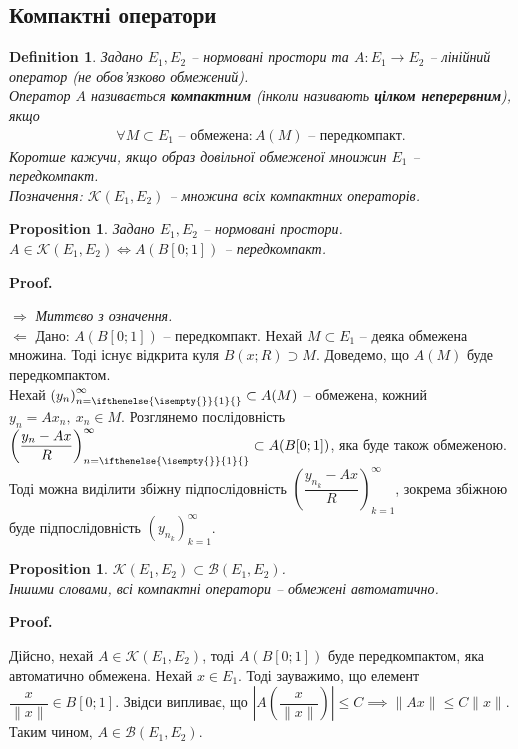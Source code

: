 \documentclass[a4paper, 10pt]{article}
\makeatletter
\def\rightproof{$\boxed{\Rightarrow}$ }
\def\leftproof{$\boxed{\Leftarrow}$ }
\theoremstyle{theoremdd}
\theoremstyle{theoremdd}
\newtheorem{definition}[theorem]{Definition}
\theoremstyle{theoremdd}
\theoremstyle{theoremdd}
\theoremstyle{theoremdd}
\newtheorem{proposition}[theorem]{Proposition}
\theoremstyle{theoremdd}
\theoremstyle{theoremdd}
\theoremstyle{theoremdd}
\newcommand{\sequence}[2][]{\left({#2}\right)_{n=\ifthenelse{\isempty{#1}}{1}{#1}}^{\infty}}
\renewenvironment{proof}[1][Proof.\\]{\par
\pushQED{\hfill \qed}%
\normalfont \topsep6\p@\@plus6\p@\relax
\trivlist
\item\relax
{\bfseries
#1\@addpunct{.}}\hspace\labelsep\ignorespaces
}{%
\popQED\endtrivlist\@endpefalse
}
\makeatother
\begin{document}
\subsection{Компактні оператори}
\begin{definition}
Задано $E_1,E_2$ -- нормовані простори та $A \colon E_1 \to E_2$ -- лінійний оператор (не обов'язково обмежений).\\
Оператор $A$ називається \textbf{компактним} (інколи називають \textbf{цілком неперервним}), якщо
\begin{align*}
\forall M \subset E_1 \text{ -- обмежена}: A(M) \text{ -- передкомпакт.}
\end{align*}
Коротше кажучи, якщо образ довільної обмеженої мноижин $E_1$ -- передкомпакт.\\
Позначення: $\mathcal{K}(E_1,E_2)$ -- множина всіх компактних операторів.
\end{definition}

\begin{proposition}
Задано $E_1,E_2$ -- нормовані простори.\\
$A \in \mathcal{K}(E_1,E_2) \iff A(B[0;1])$ -- передкомпакт.
\end{proposition}

\begin{proof}
\rightproof \textit{Миттєво з означення.}
\bigskip \\
\leftproof Дано: $A(B[0;1])$ -- передкомпакт. Нехай $M \subset E_1$ -- деяка обмежена множина. Тоді існує відкрита куля $B(x;R) \supset M$. Доведемо, що $A(M)$ буде передкомпактом.\\
Нехай $\sequence{y_n} \subset A(M)$ -- обмежена, кожний $y_n = Ax_n,\ x_n \in M$. Розглянемо послідовність $\sequence{\dfrac{y_n - Ax}{R}} \subset A(B[0;1])$, яка буде також обмеженою. Тоді можна виділити збіжну підпослідовність $\left( \dfrac{y_{n_k} - Ax}{R}\right)_{k=1}^\infty$, зокрема збіжною буде підпослідовність $(y_{n_k})_{k=1}^\infty$.
\end{proof}

\begin{proposition}
$\mathcal{K}(E_1,E_2) \subset \mathcal{B}(E_1,E_2)$.\\
Іншими словами, всі компактні оператори -- обмежені автоматично.
\end{proposition}

\begin{proof}
Дійсно, нехай $A \in \mathcal{K}(E_1,E_2)$, тоді $A(B[0;1])$ буде передкомпактом, яка автоматично обмежена. Нехай $x \in E_1$. Тоді зауважимо, що елемент $\dfrac{x}{\|x\|} \in B[0;1]$. Звідси випливає, що $\left| A\left( \dfrac{x}{\|x\|} \right)\right| \leq C \implies \|Ax\| \leq C\|x\|$. Таким чином, $A \in \mathcal{B}(E_1,E_2)$.
\end{proof}
\end{document}
